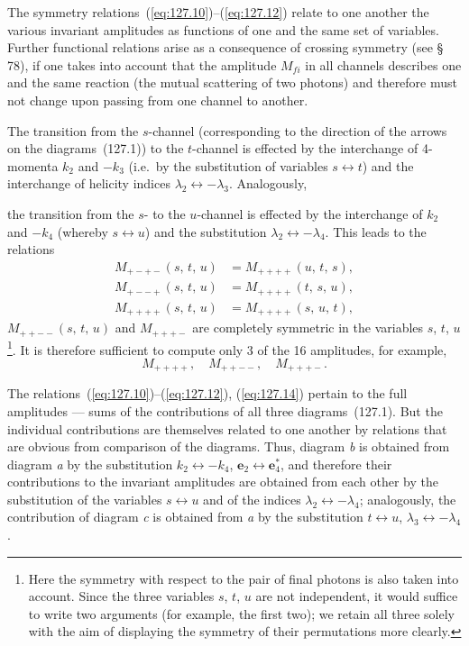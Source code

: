The symmetry relations~(\ref{eq:127.10})--(\ref{eq:127.12}) relate to one another the various invariant amplitudes as functions of one and the same set of variables. Further functional relations arise as a consequence of crossing symmetry (see \S\,78), if one takes into account that the amplitude $M_{fi}$ in all channels describes one and the same reaction (the mutual scattering of two photons) and therefore must not change upon passing from one channel to another.

The transition from the $s$-channel (corresponding to the direction of the arrows on the diagrams~(127.1)) to the $t$-channel is effected by the interchange of 4-momenta $k_2$ and $-k_3$ (i.e.\ by the substitution of variables $s \leftrightarrow t$) and the interchange of helicity indices $\lambda_2 \leftrightarrow -\lambda_3$. Analogously,


\noindent the transition from the $s$- to the $u$-channel is effected by the interchange of $k_2$ and $-k_4$ (whereby $s \leftrightarrow u$) and the substitution $\lambda_2 \leftrightarrow -\lambda_4$. This leads to the relations
\begin{equation}
\begin{split}
M_{+-+-}(s,\,t,\,u) &= M_{++++}(u,\,t,\,s), \\
M_{+--+}(s,\,t,\,u) &= M_{++++}(t,\,s,\,u), \\
M_{++++}(s,\,t,\,u) &= M_{++++}(s,\,u,\,t),
\end{split}
\label{eq:127.14}
\end{equation}
$M_{++--}(s,\,t,\,u)$ and $M_{+++-}$ are completely symmetric in the variables $s$, $t$, $u$\footnote{Here the symmetry with respect to the pair of final photons is also taken into account. Since the three variables $s$, $t$, $u$ are not independent, it would suffice to write two arguments (for example, the first two); we retain all three solely with the aim of displaying the symmetry of their permutations more clearly.}. It is therefore sufficient to compute only 3 of the 16 amplitudes, for example,
\[
M_{++++},\quad M_{++--},\quad M_{+++-}.
\]

The relations~(\ref{eq:127.10})--(\ref{eq:127.12}), (\ref{eq:127.14}) pertain to the full amplitudes --- sums of the contributions of all three diagrams~(127.1). But the individual contributions are themselves related to one another by relations that are obvious from comparison of the diagrams. Thus, diagram \textit{b} is obtained from diagram \textit{a} by the substitution $k_2 \leftrightarrow -k_4$, $\mathbf{e}_2 \leftrightarrow \mathbf{e}_4^*$, and therefore their contributions to the invariant amplitudes are obtained from each other by the substitution of the variables $s \leftrightarrow u$ and of the indices $\lambda_2 \leftrightarrow -\lambda_4$; analogously, the contribution of diagram \textit{c} is obtained from \textit{a} by the substitution $t \leftrightarrow u$, $\lambda_3 \leftrightarrow -\lambda_4$.

